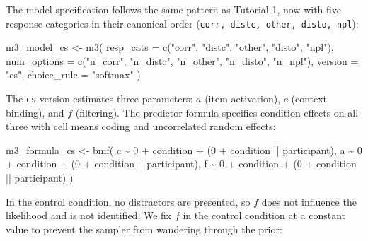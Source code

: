 \documentclass[
  man,
  floatsintext,
  longtable,
  nolmodern,
  notxfonts,
  notimes,
  colorlinks=true,linkcolor=blue,citecolor=blue,urlcolor=blue]{apa7}
\newenvironment{Shaded}{\begin{snugshade}}{\end{snugshade}}
\newcommand{\AttributeTok}[1]{\textcolor[rgb]{0.40,0.45,0.13}{#1}}
\newcommand{\DecValTok}[1]{\textcolor[rgb]{0.68,0.00,0.00}{#1}}
\newcommand{\FunctionTok}[1]{\textcolor[rgb]{0.28,0.35,0.67}{#1}}
\newcommand{\NormalTok}[1]{\textcolor[rgb]{0.00,0.23,0.31}{#1}}
\newcommand{\OtherTok}[1]{\textcolor[rgb]{0.00,0.23,0.31}{#1}}
\newcommand{\SpecialCharTok}[1]{\textcolor[rgb]{0.37,0.37,0.37}{#1}}
\newcommand{\StringTok}[1]{\textcolor[rgb]{0.13,0.47,0.30}{#1}}
\begin{document}
The model specification follows the same pattern as Tutorial 1, now with
five response categories in their canonical order
(\texttt{corr,\ distc,\ other,\ disto,\ npl}):

\begin{Shaded}
\begin{Highlighting}[]
\NormalTok{m3\_model\_cs }\OtherTok{\textless{}{-}} \FunctionTok{m3}\NormalTok{(}
  \AttributeTok{resp\_cats   =} \FunctionTok{c}\NormalTok{(}\StringTok{"corr"}\NormalTok{, }\StringTok{"distc"}\NormalTok{, }\StringTok{"other"}\NormalTok{, }\StringTok{"disto"}\NormalTok{, }\StringTok{"npl"}\NormalTok{),}
  \AttributeTok{num\_options =} \FunctionTok{c}\NormalTok{(}\StringTok{"n\_corr"}\NormalTok{, }\StringTok{"n\_distc"}\NormalTok{, }\StringTok{"n\_other"}\NormalTok{, }\StringTok{"n\_disto"}\NormalTok{, }\StringTok{"n\_npl"}\NormalTok{),}
  \AttributeTok{version     =} \StringTok{"cs"}\NormalTok{,}
  \AttributeTok{choice\_rule =} \StringTok{"softmax"}
\NormalTok{)}
\end{Highlighting}
\end{Shaded}

The \texttt{cs} version estimates three parameters: \(a\) (item
activation), \(c\) (context binding), and \(f\) (filtering). The
predictor formula specifies condition effects on all three with cell
means coding and uncorrelated random effects:

\begin{Shaded}
\begin{Highlighting}[]
\NormalTok{m3\_formula\_cs }\OtherTok{\textless{}{-}} \FunctionTok{bmf}\NormalTok{(}
\NormalTok{  c }\SpecialCharTok{\textasciitilde{}} \DecValTok{0} \SpecialCharTok{+}\NormalTok{ condition }\SpecialCharTok{+}\NormalTok{ (}\DecValTok{0} \SpecialCharTok{+}\NormalTok{ condition }\SpecialCharTok{||}\NormalTok{ participant),}
\NormalTok{  a }\SpecialCharTok{\textasciitilde{}} \DecValTok{0} \SpecialCharTok{+}\NormalTok{ condition }\SpecialCharTok{+}\NormalTok{ (}\DecValTok{0} \SpecialCharTok{+}\NormalTok{ condition }\SpecialCharTok{||}\NormalTok{ participant),}
\NormalTok{  f }\SpecialCharTok{\textasciitilde{}} \DecValTok{0} \SpecialCharTok{+}\NormalTok{ condition }\SpecialCharTok{+}\NormalTok{ (}\DecValTok{0} \SpecialCharTok{+}\NormalTok{ condition }\SpecialCharTok{||}\NormalTok{ participant)}
\NormalTok{)}
\end{Highlighting}
\end{Shaded}

In the control condition, no distractors are presented, so \(f\) does
not influence the likelihood and is not identified. We fix \(f\) in the
control condition at a constant value to prevent the sampler from
wandering through the prior:
\end{document}
